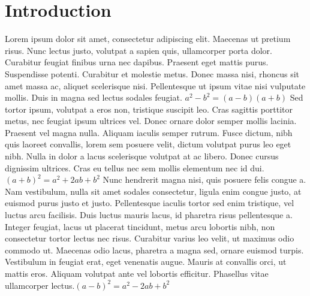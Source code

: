 \documentclass{article}
\begin{document}
\section{Introduction}
Lorem ipsum dolor sit amet, consectetur adipiscing elit. Maecenas ut pretium risus. Nunc lectus justo, volutpat a sapien quis, ullamcorper porta dolor. Curabitur feugiat finibus urna nec dapibus. Praesent eget mattis purus. Suspendisse potenti. Curabitur et molestie metus. Donec massa nisi, rhoncus sit amet massa ac, aliquet scelerisque nisi. Pellentesque ut ipsum vitae nisi vulputate mollis. Duis in magna sed lectus sodales feugiat.
\begin{math}
    a^{2}-b^{2} = (a - b)(a + b)
\end{math}
Sed tortor ipsum, volutpat a eros non, tristique suscipit leo. Cras sagittis porttitor metus, nec feugiat ipsum ultrices vel. Donec ornare dolor semper mollis lacinia. Praesent vel magna nulla. Aliquam iaculis semper rutrum. Fusce dictum, nibh quis laoreet convallis, lorem sem posuere velit, dictum volutpat purus leo eget nibh. Nulla in dolor a lacus scelerisque volutpat at ac libero. Donec cursus dignissim ultrices. Cras eu tellus nec sem mollis elementum nec id dui.
\(
(a+b)^{2}=a^{2}+2ab+b^{2}
\)
Nunc hendrerit magna nisi, quis posuere felis congue a. Nam vestibulum, nulla sit amet sodales consectetur, ligula enim congue justo, at euismod purus justo et justo. Pellentesque iaculis tortor sed enim tristique, vel luctus arcu facilisis. Duis luctus mauris lacus, id pharetra risus pellentesque a. Integer feugiat, lacus ut placerat tincidunt, metus arcu lobortis nibh, non consectetur tortor lectus nec risus. Curabitur varius leo velit, ut maximus odio commodo ut. Maecenas odio lacus, pharetra a magna sed, ornare euismod turpis. Vestibulum in feugiat erat, eget venenatis augue. Mauris at convallis orci, ut mattis eros. Aliquam volutpat ante vel lobortis efficitur. Phasellus vitae ullamcorper lectus.$(a-b)^{2}=a^{2}-2ab+b^{2} $
\end{document}
